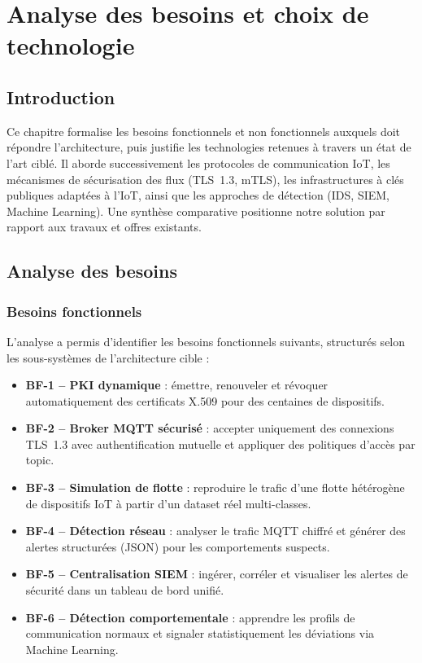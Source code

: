 \chapter{Analyse des besoins et choix de technologie}

\section{Introduction}

Ce chapitre formalise les besoins fonctionnels et non fonctionnels auxquels doit répondre l'architecture, puis justifie les technologies retenues à travers un état de l'art ciblé. Il aborde successivement les protocoles de communication IoT, les mécanismes de sécurisation des flux (TLS~1.3, mTLS), les infrastructures à clés publiques adaptées à l'IoT, ainsi que les approches de détection (IDS, SIEM, Machine Learning). Une synthèse comparative positionne notre solution par rapport aux travaux et offres existants.

\section{Analyse des besoins}

\subsection{Besoins fonctionnels}

L'analyse a permis d'identifier les besoins fonctionnels suivants, structurés selon les sous-systèmes de l'architecture cible :

\begin{itemize}
  \item \textbf{BF-1 -- PKI dynamique} : émettre, renouveler et révoquer automatiquement des certificats X.509 pour des centaines de dispositifs.
  \item \textbf{BF-2 -- Broker MQTT sécurisé} : accepter uniquement des connexions TLS~1.3 avec authentification mutuelle et appliquer des politiques d'accès par topic.
  \item \textbf{BF-3 -- Simulation de flotte} : reproduire le trafic d'une flotte hétérogène de dispositifs IoT à partir d'un dataset réel multi-classes.
  \item \textbf{BF-4 -- Détection réseau} : analyser le trafic MQTT chiffré et générer des alertes structurées (JSON) pour les comportements suspects.
  \item \textbf{BF-5 -- Centralisation SIEM} : ingérer, corréler et visualiser les alertes de sécurité dans un tableau de bord unifié.
  \item \textbf{BF-6 -- Détection comportementale} : apprendre les profils de communication normaux et signaler statistiquement les déviations via Machine Learning.
\end{itemize}

